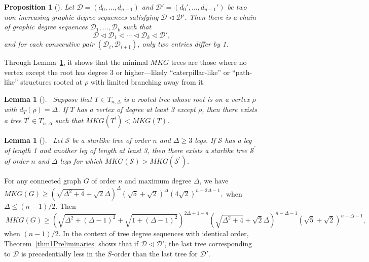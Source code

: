 \documentclass{article}
\newtheorem{lemma}[theorem]{Lemma}
\newtheorem{proposition}{Proposition}[section]
\theoremstyle{definition}
\begin{document}
\begin{proposition}[\cite{ShuchaoLSYibing,ZhangXM2013Zhang}]\label{pro2Preliminaries}
Let $\mathscr{D} = (d_0, \ldots, d_{n-1})$ and $\mathscr{D}' = (d_0', \ldots, d_{n-1}')$ be two non-increasing graphic degree sequences satisfying $\mathscr{D} \lhd \mathscr{D}'$. Then there is a chain of graphic degree sequences $\mathscr{D}_1, \ldots, \mathscr{D}_k$ such that
$$\mathscr{D} \lhd \mathscr{D}_1 \lhd \cdots \lhd \mathscr{D}_k \lhd \mathscr{D}',$$
and for each consecutive pair $(\mathscr{D}_i, \mathscr{D}_{i+1})$, only two entries differ by 1.
\end{proposition}

Through Lemma~\ref{lem1javr}, it shows that the minimal $MKG$ trees are those where no vertex except the root has degree 3 or higher—likely ``caterpillar-like'' or ``path-like'' structures rooted at $\rho$ with limited branching away from it.
\begin{lemma}[\cite{Dehgardi2025ATXari}]~\label{lem1javr}
Suppose that $T \in T_{n, \Delta}$ is a rooted tree whose root is on a vertex $\rho$ with $d_{T}(\rho)=\Delta$. If $T$ has a vertex of degree at least 3 except $\rho$, then there exists a tree $T^{\prime} \in T_{n, \Delta}$ such that $M K G\left(T^{\prime}\right)<M K G(T)$.
\end{lemma}

\begin{lemma}[\cite{Dehgardi2025ATXari}]~\label{lem2javr}
Let $\mathscr{S}$ be a starlike tree of order $n$ and $\Delta \geq 3$ legs. If $\mathscr{S}$ has a leg of length 1 and another leg of length at least 3, then there exists a starlike tree $\mathscr{S}^{\prime}$ of order $n$ and $\Delta$ legs for which $M K G(\mathscr{S})>M K G\left(\mathscr{S}^{\prime}\right)$.
\end{lemma}
For any connected graph $G$ of order $n$ and maximum degree $\Delta$, we have $M K G(G) \geq\left(\sqrt{\Delta^{2}+4}+\sqrt{2} \Delta\right)^{\Delta}(\sqrt{5}+\sqrt{2})^{\Delta}(4 \sqrt{2})^{n-2 \Delta-1},$
when $\Delta \leq (n-1)/2$. Then
\begin{equation}~\label{eqqjasn1}
M K G(G) \geq\left(\sqrt{\Delta^{2}+(\Delta-1)^{2}}+\sqrt{1+(\Delta-1)^{2}}\right)^{2 \Delta+1-n}\left(\sqrt{\Delta^{2}+4}+\sqrt{2} \Delta\right)^{n-\Delta-1}(\sqrt{5}+\sqrt{2})^{n-\Delta-1},
\end{equation}
when $(n-1)/2$. In the context of tree degree sequences with identical order, Theorem~\ref{thm1Preliminaries} shows that if $\mathscr{D} \lhd \mathscr{D}'$, the last tree corresponding to $\mathscr{D}$ is precedentially less in the $S$-order than the last tree for $\mathscr{D}'$.
\end{document}
